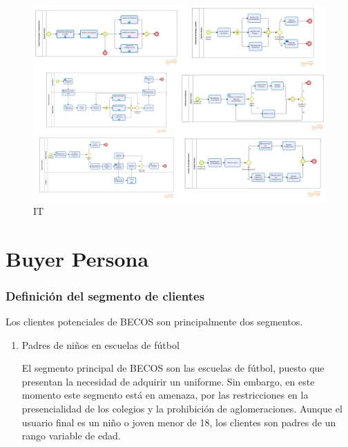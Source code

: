 \documentclass[11pt]{article}
\begin{document}
    \begin{figure}[H]
      \centering
      \includegraphics[width=.9\linewidth]{./assets/build/soporte/it/it.png}
      \caption{\label{fig:it} IT}
      \end{figure}
    
\section{Buyer Persona}
\label{sec:org8fcde79}
\subsubsection{Definición del segmento de clientes}
\label{sec:org14c8273}
Los clientes potenciales de BECOS son principalmente
dos segmentos.

\begin{enumerate}
\item Padres de niños en escuelas de fútbol

El segmento principal de BECOS son
las escuelas de fútbol, puesto
que presentan la necesidad
de adquirir un uniforme.
Sin embargo, en este momento
este segmento está en amenaza,
por las restricciones en la
presencialidad de los colegios
y la prohibición de aglomeraciones.
Aunque el usuario final es un niño
o joven menor de 18, los clientes
son padres de un rango variable de
edad.
\end{enumerate}
\end{document}
